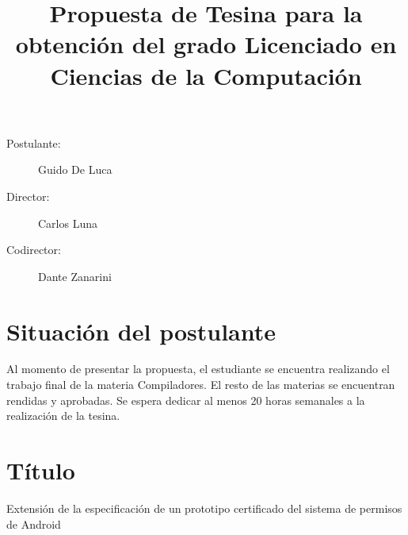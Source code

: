 \documentclass[a4paper]{article}
\begin{document}
\title{Propuesta de Tesina para la obtención del grado Licenciado en Ciencias de la Computación}
\maketitle

\begin{description}
    \item[Postulante: ] Guido De Luca
    \item[Director: ] Carlos Luna
    \item[Codirector: ] Dante Zanarini
\end{description}

\section{Situación del postulante}
Al momento de presentar la propuesta, el estudiante se encuentra realizando el
trabajo final de la materia Compiladores. El resto de las materias se encuentran
rendidas y aprobadas. Se espera dedicar al menos 20 horas semanales a la realización
de la tesina.

\section{Título}
Extensión de la especificación de un prototipo certificado del sistema de permisos
de Android









\printbibliography
\end{document}
